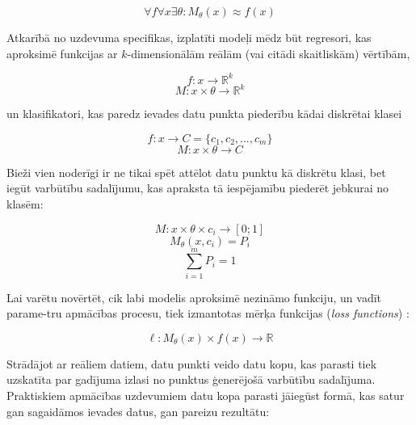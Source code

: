 \documentclass[12pt, a4paper]{article}
\numberwithin{equation}{section} %
\begin{document}
\begin{equation} 
    \forall f \forall x \exists \theta:M_{\theta}(x)\approx f(x)
\end{equation}

Atkarībā no uzdevuma specifikas, izplatīti modeļi mēdz būt regresori, kas aproksimē funkcijas ar $k$-dimensionālām reālām (vai citādi skaitliskām) vērtībām,

\begin{equation} 
    f:x \rightarrow \mathbb{R}^k
\end{equation}
\begin{equation} 
    M: x \times \theta \rightarrow \mathbb{R}^k
\end{equation}

un klasifikatori, kas paredz ievades datu punkta piederību kādai diskrētai klasei

\begin{equation} 
    f:x \rightarrow C = \lbrace c_1, c_2, ..., c_m \rbrace
\end{equation}
\begin{equation} 
     M: x \times \theta \rightarrow C
\end{equation}

Bieži vien noderīgi ir ne tikai spēt attēlot datu punktu kā diskrētu klasi, bet iegūt varbūtību sadalījumu, kas apraksta tā iespējamību piederēt jebkurai no klasēm:

\begin{equation} 
    M: x \times \theta \times c_i \rightarrow [0; 1]
\end{equation}
\begin{equation} 
    M_{\theta}(x, c_i) = P_i
\end{equation}
\begin{equation} 
    \sum_{i=1}^m P_i = 1
\end{equation}

Lai varētu novērtēt, cik labi modelis aproksimē nezināmo funkciju, un vadīt parame-tru apmācības procesu, tiek izmantotas mērķa funkcijas (\textit{loss functions}) \cite{notation}:

\begin{equation} 
    \ell: M_{\theta}(x) \times f(x) \rightarrow \mathbb{R}
\end{equation}

Strādājot ar reāliem datiem, datu punkti veido datu kopu, kas parasti tiek uzskatīta par gadījuma izlasi no punktus ģenerējošā varbūtību sadalījuma. Praktiskiem apmācības uzdevumiem datu kopa parasti jāiegūst formā, kas satur gan sagaidāmos ievades datus, gan pareizu rezultātu:
\end{document}
